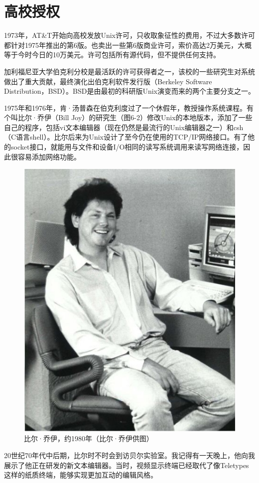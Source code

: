 \documentclass[a4paper,12pt,UTF8,twoside]{ctexbook}
\begin{document}
\section{高校授权}

1973年，AT\&T开始向高校发放Unix许可，只收取象征性的费用，不过大多数许可都针对1975年推出的第6版。也卖出一些第6版商业许可，索价高达2万美元，大概等于今时今日的10万美元。许可包括所有源代码，但不提供任何支持。

加利福尼亚大学伯克利分校是最活跃的许可获得者之一，该校的一些研究生对系统做出了重大贡献，最终演化出伯克利软件发行版（Berkeley Software Distribution，BSD）。BSD是由最初的科研版Unix演变而来的两个主要分支之一。

1975年和1976年，肯·汤普森在伯克利度过了一个休假年，教授操作系统课程。有个叫比尔·乔伊（Bill Joy）的研究生（图6-2）修改Unix的本地版本，添加了一些自己的程序，包括vi文本编辑器（现在仍然是最流行的Unix编辑器之一）和csh（C语言shell）。比尔后来为Unix设计了至今仍在使用的TCP/IP网络接口。有了他的socket接口，就能用与文件和设备I/O相同的读写系统调用来读写网络连接，因此很容易添加网络功能。

\begin{figure}[htbp]
	\centering
	\includegraphics[width=0.7\linewidth]{60}
	\caption{比尔·乔伊，约1980年（比尔·乔伊供图）}
	\label{fig:1}
\end{figure}

20世纪70年代中后期，比尔时不时会到访贝尔实验室。我记得有一天晚上，他向我展示了他正在研发的新文本编辑器。当时，视频显示终端已经取代了像Teletypes这样的纸质终端，能够实现更加互动的编辑风格。
\end{document}
